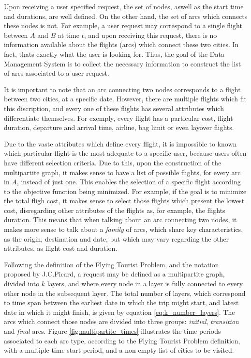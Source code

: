 
Upon receiving a user specified request, the set of nodes, aswell as the start time and durations,
are well defined. On the other hand, the set of arcs which connects these nodes is not.
For example, a user request may correspond to a single flight between $A$ and $B$ at time $t$,
and upon receiving this request, there is no information available about the flights (arcs)
which connect these two cities. In fact, thats exactly what the user is looking for.
Thus, the goal of the Data Management System is to collect the necessary information 
to construct the list of arcs associated to a user request.

It is important to note that an arc connecting two nodes corresponds 
to a flight between two cities, at a specific date. However, there are multiple 
flights which fit this discription, and every one of these flights has several attributes 
which differentiate themselves. For exemply, every flight has a particular cost,
flight duration, departure and arrival time, airline, bag limit or even 
layover flights.

Due to the vaste attributes which define every flight,
it is impossible to known which particular flight is the most adequate to a specific user,
because users often have different selection criteria.
Due to this, upon the construction of the multipartite graph,
it makes sense to have a list of possible flights, for every arc in $A$,
instead of just one.
This enables the selection of a specific flight according to the objective function being minimized.
For example, if the goal is to minimize the total fligh cost,
it makes sense to select those flights which present the lowest cost, 
disregarding other attributes of the flights as, for example, the flights duration.
This means that when talking about an arc connecting two nodes, it makes more sense to talk about 
a \textit{family} of arcs, which share key characteristics, as the origin, destination and date,
but which may vary regarding the other attributes, as flight cost and duration.


Following the definition of the Flying Tourist Problem, and the notation proposed by J.C.Picard,
a request may be defined as a multipartite graph, divided into $k$ layers,
and where every node in a layer is fully connected to every other node in the subsequent layer.
The total number of layers, which correspond to time span between the earliest date in which the trip might start,
and latest date in which it might finish, is given by equation \ref{eq:k_number_layers}.
The arcs which connect those nodes are divided into three groups: \textit{initial}, \textit{transition} and \textit{final} arcs.
Figure \ref{fig:multipartite_times} illustrates the time periods associated to each arc type,
according to the Flying Tourist Problem definition, with a multiple time start period,
and a non empty list of cities to be visited.

